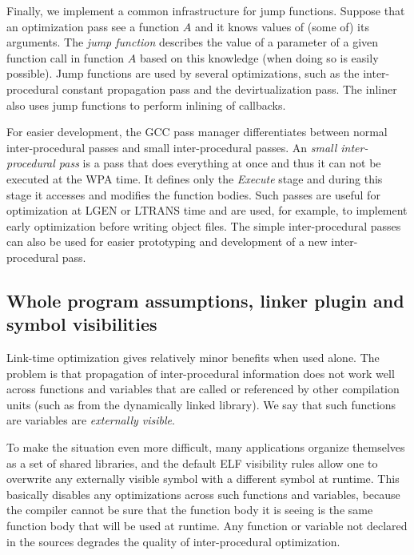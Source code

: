 \documentclass[final]{ols}
\begin{document}
Finally, we implement a common infrastructure for jump functions.  Suppose that
an optimization pass see a function $A$ and it knows values of (some of) its
arguments.  The {\em jump function} \cite{IPACP, ipa-cp} describes the value of
a parameter of a given function call in function $A$ based on this knowledge
(when doing so is easily possible).  Jump functions are used by several
optimizations, such as the inter-procedural constant propagation pass and the
devirtualization pass.  The inliner also uses jump functions to perform
inlining of callbacks.

For easier development, the GCC pass manager differentiates between normal
inter-procedural passes and small inter-procedural passes.  An {\em small
inter-procedural pass} is a pass that does everything at once and thus it can
not be executed at the WPA time. It defines only the {\em
Execute} stage and during this stage it accesses and modifies the function
bodies.  Such passes are useful for optimization at LGEN or LTRANS time
and are used, for example, to implement early optimization before
writing object files. The simple inter-procedural passes can also be used for easier
prototyping and development of a new inter-procedural pass.

\subsection{Whole program assumptions, linker plugin and symbol visibilities}
\label{plugin}

Link-time optimization gives relatively minor benefits when used
alone.  The problem is that propagation of inter-procedural information does
not work well across functions and variables that are called or referenced by
other compilation units (such as from the dynamically linked library). We say
that such functions are variables are {\em externally visible}.

To make the situation even more difficult, many applications organize
themselves as a set of shared libraries, and the default ELF visibility rules
allow one to overwrite any externally visible symbol with a different symbol at
runtime.  This basically disables any optimizations across such functions and
variables, because the compiler cannot be sure that the function body it is
seeing is the same function body that will be used at runtime.  Any function
or variable not declared  in the sources degrades the quality of
inter-procedural optimization.
\end{document}
